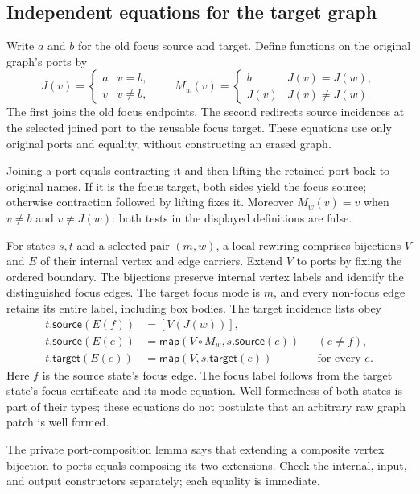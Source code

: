 \subsection{Independent equations for the target graph}
\begin{definition}\label{term:local-port-movement}
Write $a$ and $b$ for the old focus source and target. Define functions on the
original graph's ports by
\[
 J(v)=\begin{cases}a&v=b,\\v&v\ne b,\end{cases}
 \qquad
 M_w(v)=\begin{cases}b&J(v)=J(w),\\J(v)&J(v)\ne J(w).\end{cases}
\]
The first joins the old focus endpoints. The second redirects source incidences
at the selected joined port to the reusable focus target. These equations use
only original ports and equality, without constructing an erased graph.
\end{definition}
Joining a port equals contracting it and then lifting the retained port back to
original names. If it is the focus target, both sides yield the focus source;
otherwise contraction followed by lifting fixes it. Moreover $M_w(v)=v$ when
$v\ne b$ and $v\ne J(w)$: both tests in the displayed definitions are false.

\begin{definition}\label{term:local-rewiring}
For states $s,t$ and a selected pair $(m,w)$, a local rewiring comprises
bijections $V$ and $E$ of their internal vertex and edge carriers. Extend $V$
to ports by fixing the ordered boundary. The bijections preserve internal
vertex labels and identify the distinguished focus edges. The target focus mode
is $m$, and every non-focus edge retains its entire label, including box bodies.
The target incidence lists obey
\begin{align*}
 t.\mathsf{source}(E(f))&=[V(J(w))],\\
 t.\mathsf{source}(E(e))&=\mathsf{map}(V\circ M_w,s.\mathsf{source}(e))
       &&(e\ne f),\\
 t.\mathsf{target}(E(e))&=\mathsf{map}(V,s.\mathsf{target}(e))
       &&\text{for every }e.
\end{align*}
Here $f$ is the source state's focus edge. The focus label follows from the
target state's focus certificate and its mode equation. Well-formedness of
both states is part of their types; these equations do not postulate that an
arbitrary raw graph patch is well formed.
\end{definition}
The private port-composition lemma says that extending a composite vertex
bijection to ports equals composing its two extensions. Check the internal,
input, and output constructors separately; each equality is immediate.

